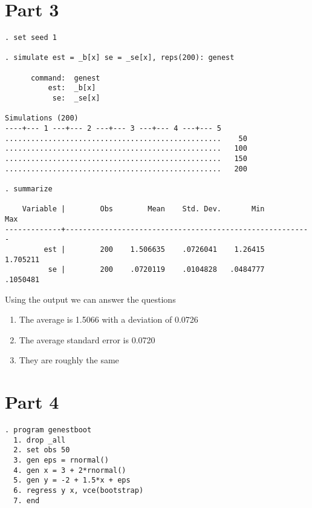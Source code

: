 \documentclass{article}
\begin{document}
\section{Part 3}
\begin{lstlisting}
. set seed 1

. simulate est = _b[x] se = _se[x], reps(200): genest

      command:  genest
          est:  _b[x]
           se:  _se[x]

Simulations (200)
----+--- 1 ---+--- 2 ---+--- 3 ---+--- 4 ---+--- 5 
..................................................    50
..................................................   100
..................................................   150
..................................................   200

. summarize

    Variable |        Obs        Mean    Std. Dev.       Min        Max
-------------+---------------------------------------------------------
         est |        200    1.506635    .0726041    1.26415   1.705211
          se |        200    .0720119    .0104828   .0484777   .1050481
\end{lstlisting}

Using the output we can answer the questions

\begin{enumerate}[label=(\alph*)]
\item The average is 1.5066 with a deviation of 0.0726
\item The average standard error is 0.0720
\item They are roughly the same
\end{enumerate}


\section{Part 4}
\begin{lstlisting}
. program genestboot
  1. drop _all
  2. set obs 50
  3. gen eps = rnormal()
  4. gen x = 3 + 2*rnormal()
  5. gen y = -2 + 1.5*x + eps
  6. regress y x, vce(bootstrap)
  7. end
\end{lstlisting}
\end{document}
